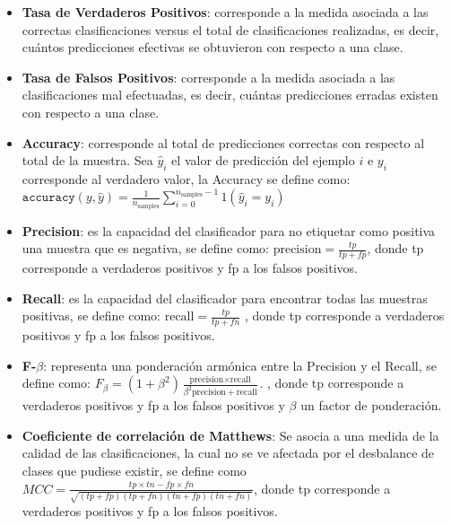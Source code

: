 \begin{itemize}
	
	\item \textbf{Tasa de Verdaderos Positivos}: corresponde a la medida asociada a las correctas clasificaciones versus el total de clasificaciones realizadas, es decir, cuántos predicciones efectivas se obtuvieron con respecto a una clase.
	
	\item \textbf{Tasa de Falsos Positivos}: corresponde a la medida asociada a las clasificaciones mal efectuadas, es decir, cuántas predicciones erradas existen con respecto a una clase.
	

	\item \textbf{Accuracy}: corresponde al total de predicciones correctas con respecto al total de la muestra. Sea $\hat{y}_i$ el valor de predicción del ejemplo $i$ e $y_{i}$ corresponde al verdadero valor, la Accuracy se define como: $\texttt{accuracy}(y, \hat{y}) = \frac{1}{n_\text{samples}} \sum_{i=0}^{n_\text{samples}-1} 1(\hat{y}_i = y_i)$
	
	\item \textbf{Precision}: es la capacidad del clasificador para no etiquetar como positiva una muestra que es negativa, se define como: $\text{precision} = \frac{tp}{tp + fp}$, donde tp corresponde a verdaderos positivos y fp a los falsos positivos.
	
	
	\item \textbf{Recall}: es la capacidad del clasificador para encontrar todas las muestras positivas, se define como: $\text{recall} = \frac{tp}{tp + fn}$ , donde tp corresponde a verdaderos positivos y fp a los falsos positivos.
	
	\item \textbf{F-$\beta$}: representa una ponderación armónica entre la Precision y el Recall, se define como: $F_\beta = (1 + \beta^2) \frac{\text{precision} \times \text{recall}}{\beta^2 \text{precision} + \text{recall}}.$ , donde tp corresponde a verdaderos positivos y fp a los falsos positivos y $\beta$ un factor de ponderación.
	
	\item \textbf{Coeficiente de correlación de Matthews}: Se asocia a una medida de la calidad de las clasificaciones, la cual no se ve afectada por el desbalance de clases que pudiese existir, se define como $MCC = \frac{tp \times tn - fp \times fn}{\sqrt{(tp + fp)(tp + fn)(tn + fp)(tn + fn)}}$, donde tp corresponde a verdaderos positivos y fp a los falsos positivos.
		
\end{itemize}

